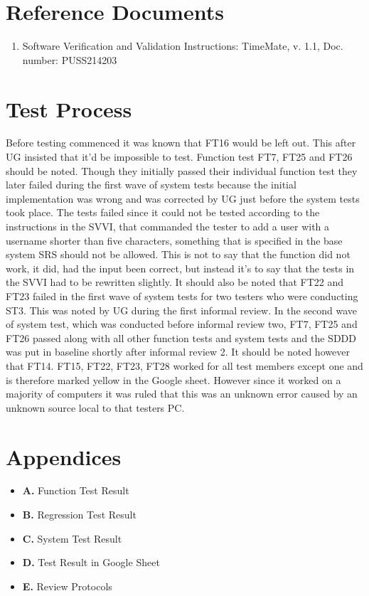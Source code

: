 \documentclass{article}
\begin{document}
\section{Reference Documents}
\begin{enumerate}
	\item Software Verification and Validation Instructions: 	TimeMate, v. 1.1, Doc. number: PUSS214203
\end{enumerate}

\section{Test Process}
Before testing commenced it was known that FT16 would be left out. This after UG insisted that it’d be impossible to test. \newline \newline Function test FT7, FT25 and FT26 should be noted. Though they initially passed their individual function test they later failed during the first wave of system tests because the initial implementation was wrong and was corrected by UG just before the system tests took place. The tests failed since it could not be tested according to the instructions in the SVVI, that commanded the tester to add a user with a username shorter than five characters, something that is specified in the base system SRS should not be allowed. This is not to say that the function did not work, it did, had the input been correct, but instead it’s to say that the tests in the SVVI had to be rewritten slightly. It should also be noted that FT22 and FT23 failed in the first wave of system tests for two testers who were conducting ST3. This was noted by UG during the first informal review. \newline \newline In the second wave of system test, which was conducted before informal review two, FT7, FT25 and FT26 passed along with all other function tests and system tests and the SDDD was put in baseline shortly after informal review 2. It should be noted however that FT14. FT15, FT22, FT23, FT28 worked for all test members except one and is therefore marked yellow in the Google sheet. However since it worked on a majority of computers it was ruled that this was an unknown error caused by an unknown source local to that testers PC.


\section{Appendices}
\begin{itemize}
\item \textbf{A.} Function Test Result
\item \textbf{B.} Regression Test Result 
\item \textbf{C.} System Test Result
\item \textbf{D.} Test Result in Google Sheet
\item \textbf{E.} Review Protocols
\end{itemize}
\end{document}
